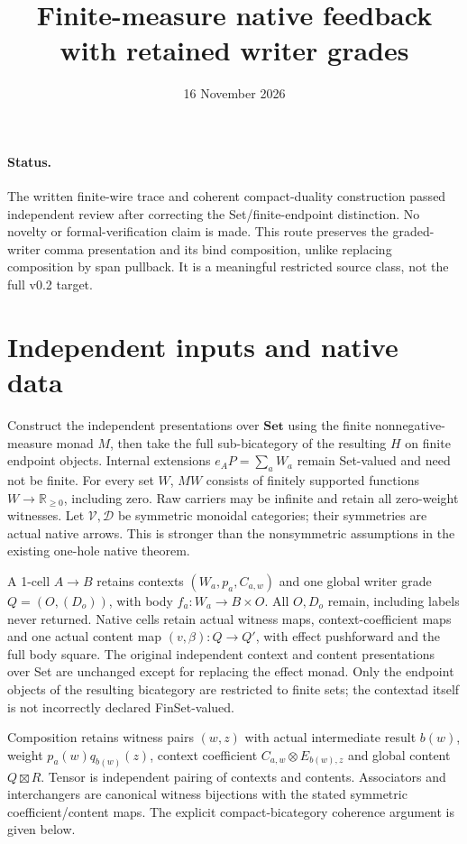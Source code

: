 \documentclass{article}
\title{Finite-measure native feedback with retained writer grades}
\date{16 November 2026}
\begin{document}
\maketitle
\paragraph{Status.} The written finite-wire trace and coherent compact-duality construction passed independent review after correcting the Set/finite-endpoint distinction. No novelty or formal-verification claim is made. This route preserves the graded-writer comma presentation and its bind composition, unlike replacing composition by span pullback. It is a meaningful restricted source class, not the full v0.2 target.
\section{Independent inputs and native data}
Construct the independent presentations over $\mathbf{Set}$ using the finite nonnegative-measure monad $M$, then take the full sub-bicategory of the resulting $H$ on finite endpoint objects. Internal extensions $e_AP=\sum_aW_a$ remain Set-valued and need not be finite. For every set $W$, $MW$ consists of finitely supported functions $W\to\mathbb R_{\ge0}$, including zero. Raw carriers may be infinite and retain all zero-weight witnesses. Let $\mathcal V,\mathcal D$ be symmetric monoidal categories; their symmetries are actual native arrows. This is stronger than the nonsymmetric assumptions in the existing one-hole native theorem.

A 1-cell $A\to B$ retains contexts $(W_a,p_a,C_{a,w})$ and one global writer grade $Q=(O,(D_o))$, with body $f_a:W_a\to B\times O$. All $O,D_o$ remain, including labels never returned. Native cells retain actual witness maps, context-coefficient maps and one actual content map $(v,\beta):Q\to Q'$, with effect pushforward and the full body square. The original independent context and content presentations over Set are unchanged except for replacing the effect monad. Only the endpoint objects of the resulting bicategory are restricted to finite sets; the contextad itself is not incorrectly declared FinSet-valued.

Composition retains witness pairs $(w,z)$ with actual intermediate result $b(w)$, weight $p_a(w)q_{b(w)}(z)$, context coefficient $C_{a,w}\otimes E_{b(w),z}$ and global content $Q\boxtimes R$. Tensor is independent pairing of contexts and contents. Associators and interchangers are canonical witness bijections with the stated symmetric coefficient/content maps. The explicit compact-bicategory coherence argument is given below.
\end{document}
